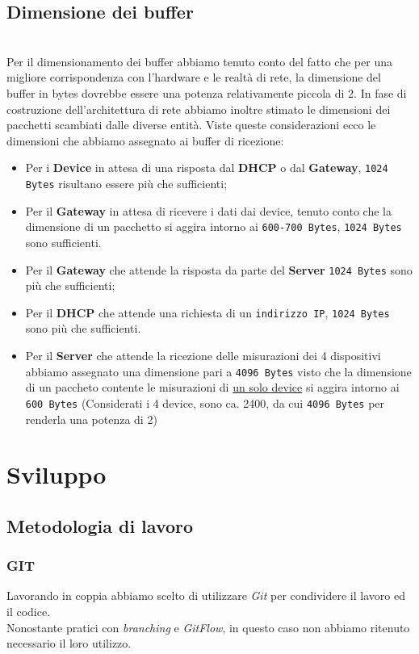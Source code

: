 \documentclass[a4paper,12pt]{report}
\begin{document}
\section{Dimensione dei buffer}
\
\\
%
Per il dimensionamento dei buffer abbiamo tenuto conto del fatto che per una migliore corrispondenza con l'hardware e le realtà di rete, la dimensione del buffer in bytes dovrebbe essere una potenza relativamente piccola di 2. In fase di costruzione dell'architettura di rete abbiamo inoltre stimato le dimensioni dei pacchetti scambiati dalle diverse entità. Viste queste considerazioni ecco le dimensioni che abbiamo assegnato ai buffer di ricezione:
%
\begin{itemize}
    \item Per i \textbf{Device} in attesa di una risposta dal \textbf{DHCP} o dal \textbf{Gateway}, \texttt{1024 Bytes} risultano essere più che sufficienti;
    \item Per il \textbf{Gateway} in attesa di ricevere i dati dai device, tenuto conto che la dimensione di un pacchetto si aggira intorno ai \texttt{600-700 Bytes}, \texttt{1024 Bytes} sono sufficienti.
    \item Per il \textbf{Gateway} che attende la risposta da parte del \textbf{Server} \texttt{1024 Bytes} sono più che sufficienti;
    \item Per il \textbf{DHCP} che attende una richiesta di un \texttt{indirizzo IP}, \texttt{1024 Bytes} sono più che sufficienti.
    \item Per il \textbf{Server} che attende la ricezione delle misurazioni dei 4 dispositivi abbiamo assegnato una dimensione pari a \texttt{4096 Bytes} visto che la dimensione di un paccheto contente le misurazioni di \underline{un solo device} si aggira intorno ai \texttt{600 Bytes} (Considerati i 4 device, sono ca. 2400, da cui \texttt{4096 Bytes} per renderla una potenza di 2)
\end{itemize}


\chapter{Sviluppo}
\section{Metodologia di lavoro}
\subsection{GIT}
Lavorando in coppia abbiamo scelto di utilizzare \textit{Git} per condividere il lavoro ed il codice.\\
Nonostante pratici con \textit{branching} e \textit{GitFlow}, in questo caso non abbiamo ritenuto necessario il loro utilizzo.\\
\end{document}
